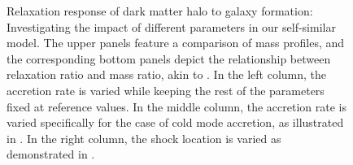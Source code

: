 \begin{figure}[htbp]
\caption{Relaxation response of dark matter halo to galaxy formation: Investigating the impact of different parameters in our self-similar model. The upper panels feature a comparison of mass profiles, and the corresponding bottom panels depict the relationship between relaxation ratio and mass ratio, akin to . In the left column, the accretion rate is varied while keeping the rest of the parameters fixed at reference values. In the middle column, the accretion rate is varied specifically for the case of cold mode accretion, as illustrated in . In the right column, the shock location is varied as demonstrated in . }
\label{fig:relx_reln_all1-ch:ssr}
\end{figure}



